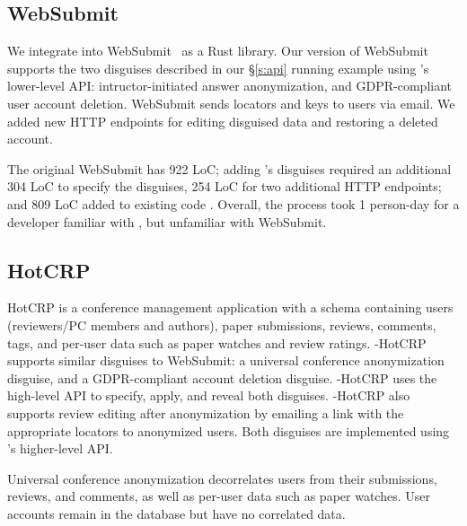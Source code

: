 
\subsection{WebSubmit}
\label{s:case-websubmit}
%
We integrate \sys into WebSubmit~\cite{websubmit-rs-anon} as a Rust library. Our version of 
WebSubmit supports the two disguises described in our \S\ref{s:api} running example using \sys's
lower-level API: intructor-initiated answer anonymization, and GDPR-compliant user account deletion.
WebSubmit sends locators and keys to users via email.
%
We added new HTTP endpoints for editing disguised data and restoring a deleted account.
%

The original WebSubmit has 922 LoC; adding \sys's disguises required an additional 304 LoC
to specify the disguises, 254 LoC for two additional HTTP endpoints; and 809 LoC added to
existing code  .
%
Overall, the process took 1 person-day for a developer familiar with \sys, but
unfamiliar with WebSubmit.
%

\subsection{HotCRP}
HotCRP is a conference management application with a schema containing users (reviewers/PC members and
authors), paper submissions, reviews, comments, tags, and per-user data such as paper watches and review ratings.
%
\sys-HotCRP supports similar disguises to WebSubmit: a universal conference anonymization disguise,
and a GDPR-compliant account deletion disguise.  \sys-HotCRP uses the high-level \sys API to
specify, apply, and reveal both disguises.  \sys-HotCRP also supports review editing after
anonymization by emailing a link with the appropriate locators to anonymized users. Both disguises
are implemented using \sys's higher-level API.

Universal conference anonymization decorrelates users from their submissions, reviews, and comments,
as well as per-user data such as paper watches. User accounts remain in the database but have no
correlated data.


